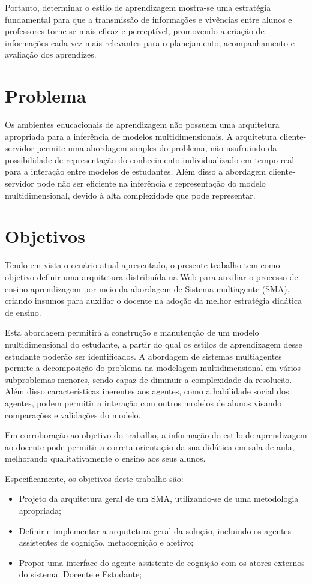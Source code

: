 Portanto, determinar o estilo de aprendizagem mostra-se uma estratégia fundamental para que a transmissão de informações e vivências entre alunos e professores torne-se mais eficaz e perceptível, promovendo a criação de informações cada vez mais relevantes para o planejamento, acompanhamento e avaliação dos aprendizes.

\section{Problema}
Os ambientes educacionais de aprendizagem não possuem uma arquitetura apropriada para a inferência de modelos multidimensionais. A arquitetura cliente-servidor permite uma abordagem simples do problema, não usufruindo da possibilidade de representação do conhecimento individualizado em tempo real para a interação entre modelos de estudantes. Além disso a abordagem cliente-servidor pode não ser eficiente na inferência e representação do modelo multidimensional, devido à alta complexidade que pode representar.

\section{Objetivos}
Tendo em vista o cenário atual apresentado, o presente trabalho tem como objetivo definir uma arquitetura distribuída na Web para auxiliar o processo de ensino-aprendizagem por meio da abordagem de Sistema multiagente (SMA), criando insumos para auxiliar o docente na adoção da melhor estratégia didática de ensino.

Esta abordagem permitirá a construção e manutenção de um modelo multidimensional do estudante, a partir do qual os estilos de aprendizagem desse estudante poderão ser identificados. A abordagem de sistemas multiagentes permite a decomposição do problema na modelagem multidimensional em vários subproblemas menores, sendo capaz de diminuir a complexidade da resolucão. Além disso características inerentes aos agentes, como a habilidade social dos agentes, podem permitir a interação com outros modelos de alunos visando comparações e validações do modelo.

Em corroboração ao objetivo do trabalho, a informação do estilo de aprendizagem ao docente pode permitir a correta orientação da sua didática em sala de aula, melhorando qualitativamente o ensino aos seus alunos.

Especificamente, os objetivos deste trabalho são:
\begin{itemize}
 	\item Projeto da arquitetura geral de um SMA, utilizando-se de uma metodologia apropriada;
	\item Definir e implementar a arquitetura geral da solução, incluindo os agentes assistentes de cognição, metacognição e afetivo;
	\item Propor uma interface do agente assistente de cognição com os atores externos do sistema: Docente e Estudante;
\end{itemize}

